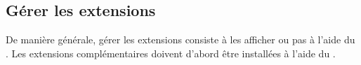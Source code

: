 %

\subsection{G\'erer les extensions}\label{sec:managing_plugins}

De mani\`ere g\'en\'erale, g\'erer les extensions consiste \`a les afficher ou pas \`a l'aide du .
Les extensions compl\'ementaires doivent d'abord \^etre install\'ees \`a l'aide du .







